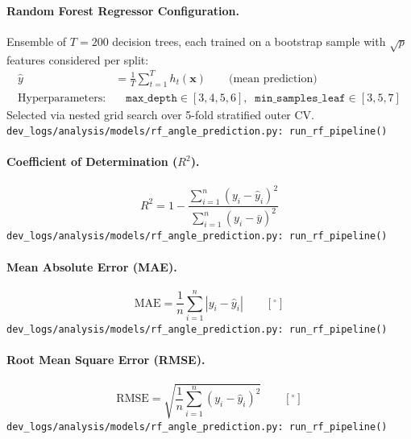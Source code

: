 \medskip
\paragraph{Random Forest Regressor Configuration.}
Ensemble of $T = 200$ decision trees, each trained on a bootstrap sample with $\sqrt{p}$ features considered per split:
\begin{align}
    \hat{y} &= \frac{1}{T}\sum_{t=1}^{T} h_t(\mathbf{x}) \qquad \text{(mean prediction)} \\
    \text{Hyperparameters:}&\quad \mathtt{max\_depth} \in [3,4,5,6],\;\; \mathtt{min\_samples\_leaf} \in [3,5,7]
\end{align}
Selected via nested grid search over 5-fold stratified outer CV.\\
\texttt{\small dev\_logs/analysis/models/rf\_angle\_prediction.py:\ run\_rf\_pipeline()}

\medskip
\paragraph{Coefficient of Determination ($R^2$).}
\begin{equation}
    R^2 = 1 - \frac{\sum_{i=1}^{n}(y_i - \hat{y}_i)^2}
                    {\sum_{i=1}^{n}(y_i - \bar{y})^2}
\end{equation}
\texttt{\small dev\_logs/analysis/models/rf\_angle\_prediction.py:\ run\_rf\_pipeline()}

\medskip
\paragraph{Mean Absolute Error (MAE).}
\begin{equation}
    \mathrm{MAE} = \frac{1}{n}\sum_{i=1}^{n} |y_i - \hat{y}_i| \qquad [^\circ]
\end{equation}
\texttt{\small dev\_logs/analysis/models/rf\_angle\_prediction.py:\ run\_rf\_pipeline()}

\medskip
\paragraph{Root Mean Square Error (RMSE).}
\begin{equation}
    \mathrm{RMSE} = \sqrt{\frac{1}{n}\sum_{i=1}^{n} (y_i - \hat{y}_i)^2} \qquad [^\circ]
\end{equation}
\texttt{\small dev\_logs/analysis/models/rf\_angle\_prediction.py:\ run\_rf\_pipeline()}

\medskip
